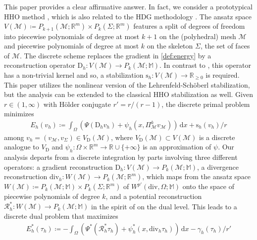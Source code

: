 \documentclass[a4paper]{amsart}
\numberwithin{equation}{section}
\renewcommand{\d}[1]{\,\mathrm{d}#1}
\renewcommand{\div}{\mathrm{div}}
\newcommand{\Mcal}{\mathcal{M}}
\newcommand{\D}{\mathrm{D}}
\newcommand{\s}{\mathrm{s}}
\newcommand{\M}{\mathbb{M}}
\theoremstyle{remark}
\begin{document}
This paper provides a clear affirmative answer.
In fact, we consider a prototypical HHO method \cite{DiPietroErnLemaire2014,DiPietroErn2015,DiPietroDroniou2020}, which is also related to the HDG methodology \cite{CockburnDiPietroErn2016}.
The ansatz space $V(\mathcal{M}) \coloneqq P_{k+1}(\mathcal{M};\mathbb{R}^m) \times P_k(\Sigma;\mathbb{R}^m)$ features a split of degrees of freedom into piecewise polynomials of degree at most $k+1$ on the (polyhedral) mesh $\mathcal{M}$ and piecewise polynomials of degree at most $k$ on the skeleton $\Sigma$, the set of faces of $\mathcal{M}$.
The discrete scheme replaces the gradient in \eqref{def:energy} by a reconstruction operator $\D_h : V(\mathcal{M}) \to P_k(\mathcal{M};\mathbb{M})$. In contrast to \cite{CarstensenTran2021}, this operator has a non-trivial kernel and so, a stabilization $\s_h : V(\Mcal) \to \mathbb{R}_{\geq 0}$ is required.
This paper utilizes the nonlinear version of the Lehrenfeld-Sch\"oberl stabilization, but the analysis can be extended to the classical HHO stabilization as well.
Given $r \in (1,\infty)$ with  H\"older conjugate $r' = r/(r-1)$, the discrete primal problem minimizes
\begin{align}\label{def:discrete-energy}
	E_h(v_h) \coloneqq \int_\Omega (\Psi(\D_h v_h) + \psi_h(x, \Pi_\Mcal^k v_\mathcal{M})) \d{x} + \s_h(v_h)/r
\end{align}
among $v_h = (v_\mathcal{M},v_\Sigma) \in V_\mathrm{D}(\mathcal{M})$,
where $V_\mathrm{D}(\mathcal{M}) \subset V(\Mcal)$ is a discrete analogue to $V_\mathrm{D}$ and $\psi_h : \Omega \times \mathbb{R}^m \to \mathbb{R} \cup \{+\infty\}$ is an approximation of $\psi$.
Our analysis departs from a discrete integration by parts involving three different operators: a gradient reconstruction $\D_h : V(\Mcal) \to P_k(\Mcal;\M)$, a divergence reconstruction $\div_h : W(\mathcal{M}) \to P_k(\mathcal{M};\mathbb{R}^m)$, which maps from the ansatz space $W(\mathcal{M}) \coloneqq P_k(\mathcal{M};\M) \times P_k(\Sigma;\mathbb{R}^m)$ of $W^{p'}(\div,\Omega;\M)$ onto the space of piecewise polynomials of degree $k$, and a potential reconstruction $\mathcal{R}_h^* : W(\Mcal) \to P_k(\Mcal;\M)$ in the spirit of \cite{DiPietroDroniouRapetti2020,DiPietroDroniou2023} on the dual level.
This leads to a discrete dual problem that maximizes
\begin{align}\label{def:discrete-dual-energy}
	E_h^*(\tau_h) \coloneqq -\int_\Omega (\Psi^*(\mathcal{R}^*_h \tau_h) + \psi_h^*(x,\div_h \tau_h)) \d{x} - \gamma_h(\tau_h)/r'
\end{align}
\end{document}
